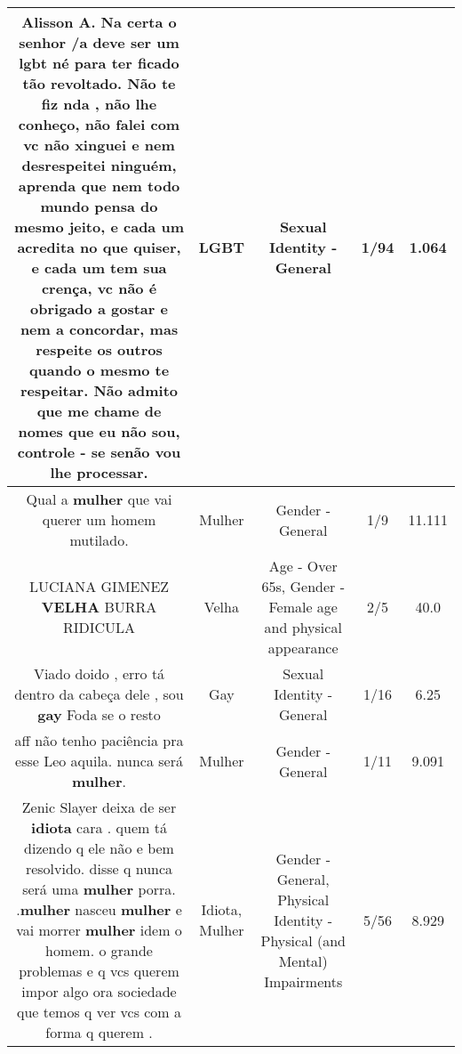\documentclass[11pt]{article}
\newlength\mylength
\begin{document}
\begin{center}
\begin{longtable}{|C{.65\mylength}|C{.30\mylength}|C{.12\mylength}|C{.12\mylength}|C{.12\mylength}|}
  \small Alisson A. Na certa o senhor /a deve ser um \textbf{lgbt} né para ter ficado tão revoltado. Não te fiz nda , não lhe conheço,  não falei com vc   não xinguei e nem desrespeitei ninguém, aprenda que nem todo mundo pensa do mesmo jeito, e cada um acredita no que quiser,  e cada um tem sua crença, vc não é obrigado a gostar e nem a concordar,  mas respeite os outros quando o mesmo te respeitar. Não admito que me chame de nomes que eu não sou, controle - se senão vou lhe processar.\normalsize   & LGBT & Sexual Identity - General & 1/94 & 1.064 \\  \hline
  \small Qual a \textbf{mulher} que vai querer um homem mutilado.\normalsize   & Mulher & Gender - General & 1/9 & 11.111 \\  \hline
  \small LUCIANA GIMENEZ \textbf{V\textbf{ELHA}} BURRA RIDICULA\normalsize   & Velha & Age - Over 65s, Gender - Female age and physical appearance & 2/5 & 40.0 \\  \hline
  \small Viado doido , erro tá dentro da cabeça dele , sou \textbf{gay} Foda se o resto\normalsize   & Gay & Sexual Identity - General & 1/16 & 6.25 \\  \hline
  \small aff não tenho paciência pra esse Leo aquila. nunca será \textbf{mulher}.\normalsize   & Mulher & Gender - General & 1/11 & 9.091 \\  \hline
  \small Zenic Slayer deixa de ser \textbf{idiota} cara . quem tá dizendo q ele não e bem resolvido.  disse q nunca será uma \textbf{mulher} porra. .\textbf{mulher} nasceu \textbf{mulher} e vai morrer \textbf{mulher} idem o homem.  o grande problemas e q vcs querem impor algo ora sociedade que temos q ver vcs com a forma q querem .\normalsize   & Idiota, Mulher & Gender - General, Physical Identity - Physical (and Mental) Impairments & 5/56 & 8.929 \\  \hline

\end{longtable}
\end{center}
\end{document}
